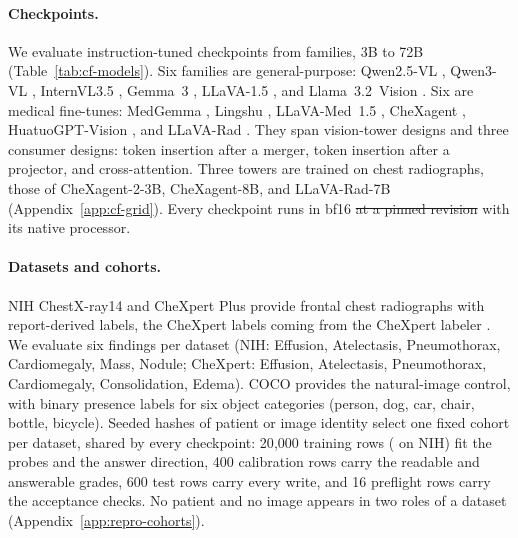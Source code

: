 \documentclass{article}
\makeatletter
\providecommand{\DIFdeltex}[1]{{\protect\color{red}\sout{#1}}} %
\providecommand{\DIFdelbegin}{} %
\providecommand{\DIFdelend}{} %
\providecommand{\DIFdel}[1]{\texorpdfstring{\DIFdeltex{#1}}{}} %
\providecommand{\DIFscaledelfig}{0.5}
\newlength{\DIFdelgraphicswidth} %
\newlength{\DIFdelgraphicsheight} %
\providecommand{\DIFdelincludegraphics}[2][]{%
\sbox{\DIFdelgraphicsbox}{\DIFOincludegraphics[#1]{#2}}%
\settoboxwidth{\DIFdelgraphicswidth}{\DIFdelgraphicsbox} %
\settoboxtotalheight{\DIFdelgraphicsheight}{\DIFdelgraphicsbox} %
\scalebox{\DIFscaledelfig}{%
\parbox[b]{\DIFdelgraphicswidth}{\usebox{\DIFdelgraphicsbox}\\[-\baselineskip] \rule{\DIFdelgraphicswidth}{0em}}\llap{\resizebox{\DIFdelgraphicswidth}{\DIFdelgraphicsheight}{%
\setlength{\unitlength}{\DIFdelgraphicswidth}%
\begin{picture}(1,1)%
\thicklines\linethickness{2pt} %
{\color[rgb]{1,0,0}\put(0,0){\framebox(1,1){}}}%
{\color[rgb]{1,0,0}\put(0,0){\line( 1,1){1}}}%
{\color[rgb]{1,0,0}\put(0,1){\line(1,-1){1}}}%
\end{picture}%
}\hspace*{3pt}}} %
} %
\DeclareRobustCommand{\DIFdelbegin}{\DIFOdelbegin \let\includegraphics\DIFdelincludegraphics} %
\DeclareRobustCommand{\DIFdelend}{\DIFOaddend \let\includegraphics\DIFOincludegraphics} %
\let\sout@orig\sout %
\renewcommand{\sout}[1]{\ifmmode\text{\sout@orig{\ensuremath{#1}}}\else\sout@orig{#1}\fi} %
\makeatother
\begin{document}
\paragraph{Checkpoints.}
We evaluate \cfCheckpoints{} instruction-tuned checkpoints from \cfFamiliesWord{} families, 3B to 72B (Table~\ref{tab:cf-models}). Six families are general-purpose: Qwen2.5-VL \citep{bai2025qwen25vl}, Qwen3-VL \citep{qwen2025qwen3vl}, InternVL3.5 \citep{wang2025internvl35}, Gemma~3 \citep{gemma2025gemma3}, LLaVA-1.5 \citep{liu2024improved}, and Llama~3.2~Vision \citep{meta2024llama32vision}. Six are medical fine-tunes: MedGemma \citep{sellergren2025medgemma}, Lingshu \citep{lasa2025lingshu}, LLaVA-Med~1.5 \citep{li2023llavamed}, CheXagent \citep{chen2024chexagent}, HuatuoGPT-Vision \citep{chen2024huatuogptvision}, and LLaVA-Rad \citep{zambranochaves2025llavarad}. They span \cfTowerDesignsWord{} vision-tower designs and three consumer designs: token insertion after a merger, token insertion after a projector, and cross-attention. Three towers are trained on chest radiographs, those of CheXagent-2-3B, CheXagent-8B, and LLaVA-Rad-7B (Appendix~\ref{app:cf-grid}). Every checkpoint runs in bf16 \DIFdelbegin \DIFdel{at a pinned revision }\DIFdelend with its native processor.

\paragraph{Datasets and cohorts.}
NIH ChestX-ray14 \citep{wang2017chestxray} and CheXpert Plus \citep{chambon2024chexpertplus} provide frontal chest radiographs with report-derived labels, the CheXpert labels coming from the CheXpert labeler \citep{irvin2019chexpert}. We evaluate six findings per dataset (NIH: Effusion, Atelectasis, Pneumothorax, Cardiomegaly, Mass, Nodule; CheXpert: Effusion, Atelectasis, Pneumothorax, Cardiomegaly, Consolidation, Edema). COCO \citep{lin2014coco} provides the natural-image control, with binary presence labels for six object categories (person, dog, car, chair, bottle, bicycle). Seeded hashes of patient or image identity select one fixed cohort per dataset, shared by every checkpoint: 20{,}000 training rows (\cfCohortNihTrainRows{} on NIH) fit the probes and the answer direction, 400 calibration rows carry the readable and answerable grades, 600 test rows carry every write, and 16 preflight rows carry the acceptance checks. No patient and no image appears in two roles of a dataset (Appendix~\ref{app:repro-cohorts}).
\end{document}
